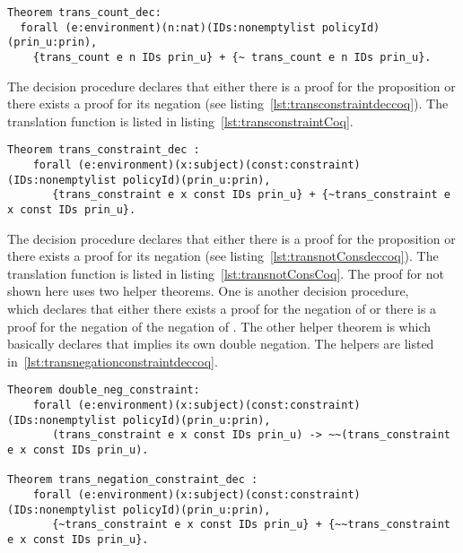 \begin{lstlisting}
Theorem trans_count_dec: 
  forall (e:environment)(n:nat)(IDs:nonemptylist policyId)(prin_u:prin), 
    {trans_count e n IDs prin_u} + {~ trans_count e n IDs prin_u}.
\end{lstlisting}

The decision procedure  declares that either there is a proof for the proposition  or there exists a proof for its negation (see listing~\ref{lst:transconstraintdeccoq}). The translation function  is listed in listing~\ref{lst:transconstraintCoq}. 


\begin{minipage}[c]{0.95\textwidth}
\begin{lstlisting}
Theorem trans_constraint_dec :
    forall (e:environment)(x:subject)(const:constraint)(IDs:nonemptylist policyId)(prin_u:prin),
       {trans_constraint e x const IDs prin_u} + {~trans_constraint e x const IDs prin_u}.
\end{lstlisting}
\end{minipage}

The decision procedure  declares that either there is a proof for the proposition  or there exists a proof for its negation (see listing~\ref{lst:transnotConsdeccoq}). The translation function  is listed in listing~\ref{lst:transnotConsCoq}. The proof for  not shown here uses two helper theorems. One is another decision procedure, \\  which declares that either there exists a proof for the negation of  or there is a proof for the negation of the negation of . The other helper theorem is  which basically declares that  implies its own double negation. The helpers are listed in~\ref{lst:transnegationconstraintdeccoq}.

\begin{lstlisting}
Theorem double_neg_constraint:
    forall (e:environment)(x:subject)(const:constraint)(IDs:nonemptylist policyId)(prin_u:prin),
       (trans_constraint e x const IDs prin_u) -> ~~(trans_constraint e x const IDs prin_u).
  
Theorem trans_negation_constraint_dec :
    forall (e:environment)(x:subject)(const:constraint)(IDs:nonemptylist policyId)(prin_u:prin),
       {~trans_constraint e x const IDs prin_u} + {~~trans_constraint e x const IDs prin_u}.
       
\end{lstlisting}

